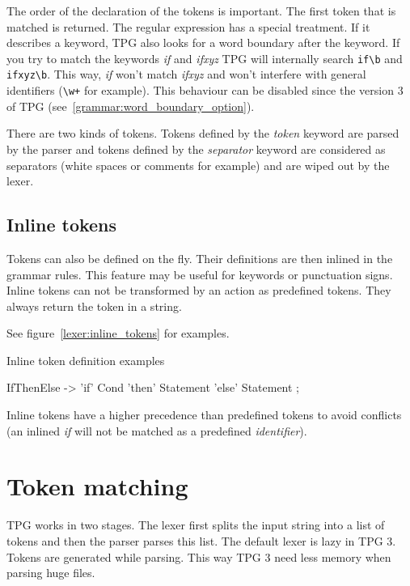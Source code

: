 The order of the declaration of the tokens is important. The first token that is matched is returned. The regular expression has a special treatment. If it describes a keyword, TPG also looks for a word boundary after the keyword. If you try to match the keywords \emph{if} and \emph{ifxyz} TPG will internally search \verb$if\b$ and \verb$ifxyz\b$. This way, \emph{if} won't match \emph{ifxyz} and won't interfere with general identifiers (\verb$\w+$ for example). This behaviour can be disabled since the version 3 of TPG (see~\ref{grammar:word_boundary_option}).

There are two kinds of tokens. Tokens defined by the \emph{token} keyword are parsed by the parser and tokens defined by the \emph{separator} keyword are considered as separators (white spaces or comments for example) and are wiped out by the lexer.

\subsection{Inline tokens}

Tokens can also be defined on the fly. Their definitions are then inlined in the grammar rules.
This feature may be useful for keywords or punctuation signs.
Inline tokens can not be transformed by an action as predefined tokens.
They always return the token in a string.

See figure~\ref{lexer:inline_tokens} for examples.

\begin{code}
\caption{Inline token definition examples}                  \label{lexer:inline_tokens}
\begin{verbatimtab}[4]
    IfThenElse ->
        'if' Cond
        'then' Statement
        'else' Statement
        ;
\end{verbatimtab}
\end{code}

Inline tokens have a higher precedence than predefined tokens to avoid conflicts (an inlined \emph{if} will not be matched as a predefined \emph{identifier}).

\section{Token matching}                                    \label{lexer:token_matching}

TPG works in two stages.
The lexer first splits the input string into a list of tokens and then the parser parses this list.
The default lexer is lazy in TPG 3. Tokens are generated while parsing.
This way TPG 3 need less memory when parsing huge files.

